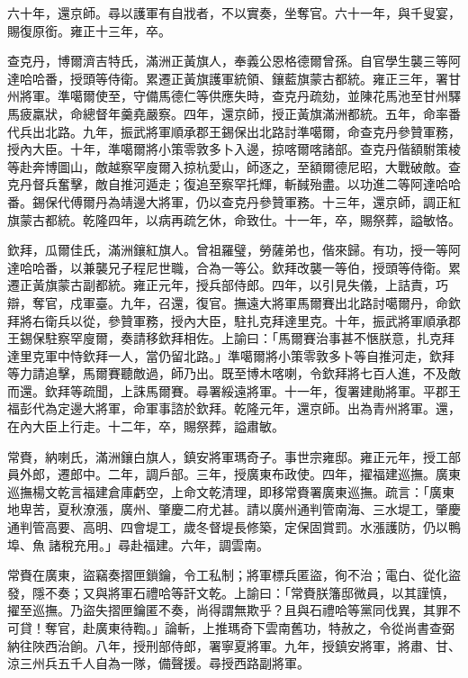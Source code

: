 \begin{pinyinscope}
六十年，還京師。尋以護軍有自戕者，不以實奏，坐奪官。六十一年，與千叟宴，賜復原銜。雍正十三年，卒。

查克丹，博爾濟吉特氏，滿洲正黃旗人，奉義公恩格德爾曾孫。自官學生襲三等阿達哈哈番，授頭等侍衛。累遷正黃旗護軍統領、鑲藍旗蒙古都統。雍正三年，署甘州將軍。準噶爾使至，守備馬德仁等供應失時，查克丹疏劾，並陳花馬池至甘州驛馬疲羸狀，命總督年羹堯嚴察。四年，還京師，授正黃旗滿洲都統。五年，命率番代兵出北路。九年，振武將軍順承郡王錫保出北路討準噶爾，命查克丹參贊軍務，授內大臣。十年，準噶爾將小策零敦多卜入邊，掠喀爾喀諸部。查克丹偕額駙策棱等赴奔博圖山，敵越察罕廋爾入掠杭愛山，師逐之，至額爾德尼昭，大戰破敵。查克丹督兵奮擊，敵自推河遁走；復追至察罕托輝，斬馘殆盡。以功進二等阿達哈哈番。錫保代傅爾丹為靖邊大將軍，仍以查克丹參贊軍務。十三年，還京師，調正紅旗蒙古都統。乾隆四年，以病再疏乞休，命致仕。十一年，卒，賜祭葬，謚敏恪。

欽拜，瓜爾佳氏，滿洲鑲紅旗人。曾祖羅璧，勞薩弟也，偕來歸。有功，授一等阿達哈哈番，以兼襲兄子程尼世職，合為一等公。欽拜改襲一等伯，授頭等侍衛。累遷正黃旗蒙古副都統。雍正元年，授兵部侍郎。四年，以引見失儀，上詰責，巧辯，奪官，戍軍臺。九年，召還，復官。撫遠大將軍馬爾賽出北路討噶爾丹，命欽拜將右衛兵以從，參贊軍務，授內大臣，駐扎克拜達里克。十年，振武將軍順承郡王錫保駐察罕廋爾，奏請移欽拜相佐。上諭曰：「馬爾賽治事甚不愜朕意，扎克拜達里克軍中恃欽拜一人，當仍留北路。」準噶爾將小策零敦多卜等自推河走，欽拜等力請追擊，馬爾賽聽敵過，師乃出。既至博木喀喇，令欽拜將七百人進，不及敵而還。欽拜等疏聞，上誅馬爾賽。尋署綏遠將軍。十一年，復署建勛將軍。平郡王福彭代為定邊大將軍，命軍事諮於欽拜。乾隆元年，還京師。出為青州將軍。還，在內大臣上行走。十二年，卒，賜祭葬，謚肅敏。

常賚，納喇氏，滿洲鑲白旗人，鎮安將軍瑪奇子。事世宗雍邸。雍正元年，授工部員外郎，遷郎中。二年，調戶部。三年，授廣東布政使。四年，擢福建巡撫。廣東巡撫楊文乾言福建倉庫虧空，上命文乾清理，即移常賚署廣東巡撫。疏言：「廣東地卑苦，夏秋潦漲，廣州、肇慶二府尤甚。請以廣州通判管南海、三水堤工，肇慶通判管高要、高明、四會堤工，歲冬督堤長修築，定保固賞罰。水漲護防，仍以鴨埠、魚諸稅充用。」尋赴福建。六年，調雲南。

常賚在廣東，盜竊奏摺匣鎖鑰，令工私制；將軍標兵匿盜，徇不治；電白、從化盜發，隱不奏；又與將軍石禮哈等訐文乾。上諭曰：「常賚朕籓邸微員，以其謹慎，擢至巡撫。乃盜失摺匣鑰匿不奏，尚得謂無欺乎？且與石禮哈等黨同伐異，其罪不可貸！奪官，赴廣東待鞫。」論斬，上推瑪奇下雲南舊功，特赦之，令從尚書查弼納往陜西治餉。八年，授刑部侍郎，署寧夏將軍。九年，授鎮安將軍，將肅、甘、涼三州兵五千人自為一隊，備聲援。尋授西路副將軍。


\end{pinyinscope}
